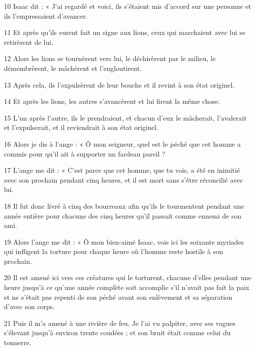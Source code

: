 \par 10 Isaac dit : « J'ai regardé et voici, ils s'étaient mis d'accord sur une personne et ils l'empressaient d'avancer.

\par 11 Et après qu'ils eurent fait un signe aux lions, ceux qui marchaient avec lui se retirèrent de lui.

\par 12 Alors les lions se tournèrent vers lui, le déchirèrent par le milieu, le démembrèrent, le mâchèrent et l'engloutirent.

\par 13 Après cela, ils l'expulsèrent de leur bouche et il revint à son état originel.

\par 14 Et après les lions, les autres s'avancèrent et lui firent la même chose.

\par 15 L'un après l'autre, ils le prendraient, et chacun d'eux le mâcherait, l'avalerait et l'expulserait, et il reviendrait à son état originel.

\par 16 Alors je dis à l'ange : « Ô mon seigneur, quel est le péché que cet homme a commis pour qu'il ait à supporter un fardeau pareil ?

\par 17 L'ange me dit : « C'est parce que cet homme, que tu vois, a été en inimitié avec son prochain pendant cinq heures, et il est mort sans s'être réconcilié avec lui.

\par 18 Il fut donc livré à cinq des bourreaux afin qu'ils le tourmentent pendant une année entière pour chacune des cinq heures qu'il passait comme ennemi de son ami.

\par 19 Alors l'ange me dit : « Ô mon bien-aimé Isaac, vois ici les soixante myriades qui infligent la torture pour chaque heure où l'homme reste hostile à son prochain.

\par 20 Il est amené ici vers ces créatures qui le torturent, chacune d'elles pendant une heure jusqu'à ce qu'une année complète soit accomplie s'il n'avait pas fait la paix et ne s'était pas repenti de son péché avant son enlèvement et sa séparation d'avec son corps.

\par 21 Puis il m'a amené à une rivière de feu. Je l'ai vu palpiter, avec ses vagues s'élevant jusqu'à environ trente coudées ; et son bruit était comme celui du tonnerre.

